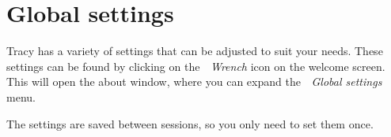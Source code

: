\chapter{Global settings }
\hypertarget{md__mono_engine_2thirdparty_2tracy_2profiler_2src_2achievements_2_global_settings}{}\label{md__mono_engine_2thirdparty_2tracy_2profiler_2src_2achievements_2_global_settings}
\label{md__mono_engine_2thirdparty_2tracy_2profiler_2src_2achievements_2_global_settings_autotoc_md1107}%
%


Tracy has a variety of settings that can be adjusted to suit your needs. These settings can be found by clicking on the {\itshape  Wrench} icon on the welcome screen. This will open the about window, where you can expand the {\itshape  Global settings} menu.

The settings are saved between sessions, so you only need to set them once. 